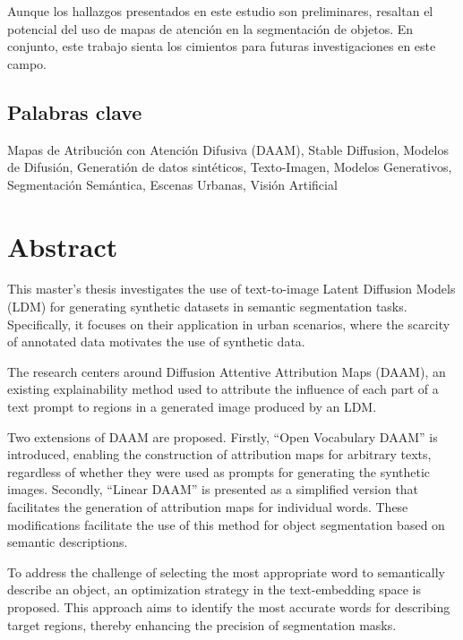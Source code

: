Aunque los hallazgos presentados en este estudio son preliminares, resaltan el potencial del uso de mapas de atención en la segmentación de objetos. En conjunto, este trabajo sienta los cimientos para futuras investigaciones en este campo.

\vfill
\section*{Palabras clave}

 Mapas de Atribución con Atención Difusiva (DAAM), Stable Diffusion, Modelos de Difusión, Generatión de datos sintéticos, Texto-Imagen, Modelos Generativos, Segmentación Semántica, Escenas Urbanas, Visión Artificial

\newpage
\chapter*{Abstract}

This master's thesis investigates the use of text-to-image Latent Diffusion Models (LDM) for generating synthetic datasets in semantic segmentation tasks. Specifically, it focuses on their application in urban scenarios, where the scarcity of annotated data motivates the use of synthetic data.

The research centers around Diffusion Attentive Attribution Maps (DAAM), an existing explainability method used to attribute the influence of each part of a text prompt to regions in a generated image produced by an LDM.

Two extensions of DAAM are proposed. Firstly, ``Open Vocabulary DAAM'' is introduced, enabling the construction of attribution maps for arbitrary texts, regardless of whether they were used as prompts for generating the synthetic images. Secondly, ``Linear DAAM'' is presented as a simplified version that facilitates the generation of attribution maps for individual words. These modifications facilitate the use of this method for object segmentation based on semantic descriptions.

To address the challenge of selecting the most appropriate word to semantically describe an object, an optimization strategy in the text-embedding space is proposed. This approach aims to identify the most accurate words for describing target regions, thereby enhancing the precision of segmentation masks.

